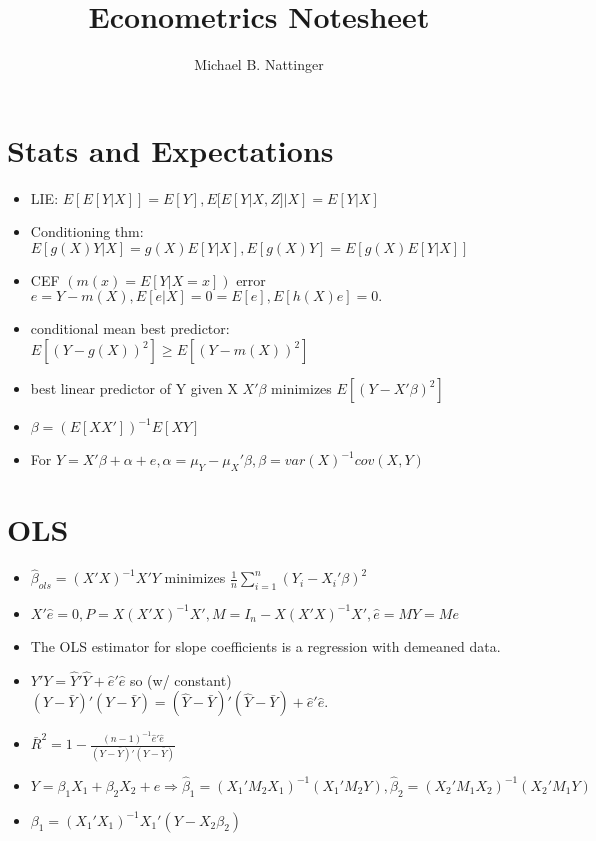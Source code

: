 \documentclass[11pt]{article} %
\title{Econometrics Notesheet}
\author{Michael B. Nattinger}
\begin{document}
\maketitle
\section{Stats and Expectations}
\begin{itemize}
\item LIE: $E[E[Y|X]] = E[Y], E[E[Y|X,Z]|X] = E[Y|X]$
\item Conditioning thm: $E[g(X)Y|X] = g(X)E[Y|X], E[g(X)Y] = E[g(X)E[Y|X]]$
\item CEF $ (m(x) = E[Y|X=x])$ error $e = Y-m(X), E[e|X] = 0 = E[e],E[h(X)e] = 0.$
\item conditional mean best predictor: $E[(Y-g(X))^2]\geq E[(Y-m(X))^2]$
\item best linear predictor of Y given X $X'\beta$ minimizes $E[(Y-X'\beta)^2]$
\item $\beta = (E[XX'])^{-1} E[XY]$
\item For $Y = X'\beta + \alpha + e, \alpha = \mu_Y - \mu_X'\beta, \beta = var(X)^{-1}cov(X,Y)$
\end{itemize}
\section{OLS}
\begin{itemize}
\item $\hat{\beta}_{ols} = (X'X)^{-1}X'Y$ minimizes $\frac{1}{n}\sum_{i=1}^n (Y_i - X_i'\beta)^2$
\item $X'\hat{e} = 0, P = X(X'X)^{-1}X', M = I_n - X(X'X)^{-1}X', \hat{e} = MY = Me$
\item The OLS estimator for slope coefficients is a regression with demeaned data.
\item $Y'Y = \hat{Y}'\hat{Y} + \hat{e}'\hat{e}$ so (w/ constant) $(Y-\bar{Y})'(Y-\bar{Y}) = (\hat{Y}-\bar{Y})'(\hat{Y}-\bar{Y}) + \hat{e}'\hat{e}$.
\item $\bar{R}^2 = 1 - \frac{(n-1)^{-1}\hat{e}'\hat{e}}{(Y-\bar{Y})'(Y-\bar{Y})}$
\item $Y = \beta_1 X_1 + \beta_2 X_2 + e \Rightarrow \hat{\beta}_1 = (X_1'M_2X_1)^{-1}(X_1'M_2Y), \hat{\beta}_2 = (X_2'M_1X_2)^{-1}(X_2'M_1Y)$
\item $\beta_1 = (X_1'X_1)^{-1}X_1'(Y - X_2\beta_2)$
\end{itemize}
\end{document}
